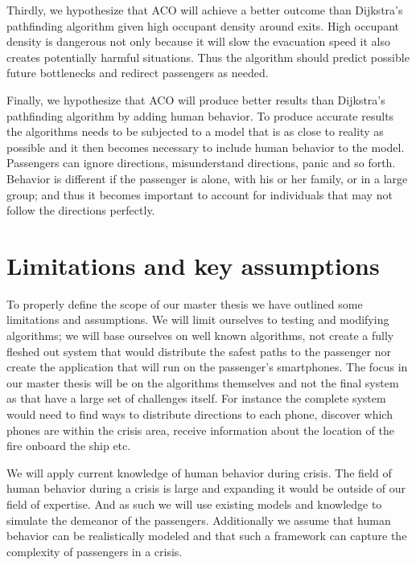 Thirdly, we hypothesize that ACO will achieve a better outcome than Dijkstra's pathfinding algorithm
given high occupant density around exits. High occupant density is dangerous not only
because it will slow the evacuation speed it also creates potentially harmful situations. Thus the algorithm
should predict possible future bottlenecks and redirect passengers as needed.

Finally, we hypothesize that ACO will produce better results than Dijkstra's pathfinding algorithm                 
by adding human behavior. To produce accurate results the algorithms needs to be subjected
to a model that is as close to reality as possible and it then becomes necessary to include
human behavior to the model. Passengers can ignore directions, misunderstand directions, panic
and so forth. Behavior is different if the passenger is alone, with his or her family, or in a large group;
and thus it becomes important to account for individuals that may not follow the directions perfectly.

\section{Limitations and key assumptions}

To properly define the scope of our master thesis we have outlined                                                                               %
some limitations and assumptions. We will limit ourselves to testing and modifying algorithms;                                  
we will base ourselves on well known algorithms, not create a fully fleshed out system that would distribute the 
safest paths to the passenger nor create the application that will run on the passenger's smartphones.
The focus in our master thesis will be on the algorithms themselves and not the final system as that have a large set
of challenges itself. For instance the complete system would need to find ways to distribute directions to each phone,
discover which phones are within the crisis area, receive information about the location of the fire onboard the ship etc.

We will apply current knowledge of human behavior during crisis. The field of human behavior during a crisis is large
and expanding it would be outside of our field of expertise. And as such we will use existing models and knowledge
to simulate the demeanor of the passengers. Additionally we assume that human behavior can be realistically modeled
and that such a framework can capture the complexity of passengers in a crisis.

